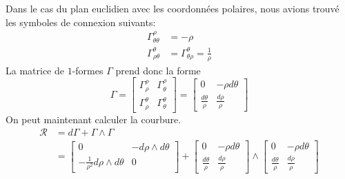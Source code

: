 \documentclass[a4paper,11pt]{report}
\begin{document}
                \begin{exmp}
                    Dans le cas du plan euclidien avec les coordonnées polaires, nous avions trouvé les symboles de connexion suivants:
                    \begin{align}
                            \Gamma^\rho_{\theta\theta} &= -\rho\\
                            \Gamma^\theta_{\rho\theta} &= \Gamma^\theta_{\theta\rho} = \frac{1}{\rho}
                    \end{align}
                    La matrice de $1$-formes $\Gamma$ prend donc la forme
                    \begin{equation}
                        \Gamma =
                        \begin{bmatrix}
                            \Gamma^\rho_\rho & \Gamma^\rho_\theta \\
                            \Gamma^\theta_\rho & \Gamma^\theta_\theta
                        \end{bmatrix}
                         = 
                         \begin{bmatrix}
                            0 & -\rho d\theta \\
                            \frac{d\theta}{\rho} & \frac{d\rho}{\rho}
                        \end{bmatrix}
                    \end{equation}
                    On peut maintenant calculer la courbure.
                    \begin{align}
                        \mathscr{R} &= d\Gamma+\Gamma\wedge\Gamma \\
                        &= \begin{bmatrix}
                            0 & -d\rho\wedge d\theta \\
                            -\frac{1}{\rho^2}d\rho\wedge d\theta & 0
                        \end{bmatrix}+
                        \begin{bmatrix}
                            0 & -\rho d\theta \\
                            \frac{d\theta}{\rho} & \frac{d\rho}{\rho}
                        \end{bmatrix}\wedge
                        \begin{bmatrix}
                            0 & -\rho d\theta \\
                            \frac{d\theta}{\rho} & \frac{d\rho}{\rho}

\end{bmatrix}
\end{align}
\end{exmp}
\end{document}
